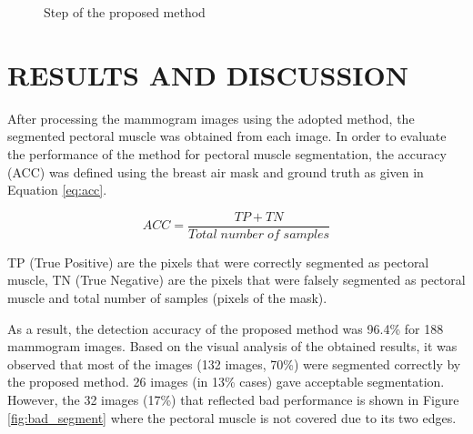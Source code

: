 \documentclass{article}
\begin{document}
\begin{figure}
\caption{Step of the proposed method}
\end{figure}


\section{RESULTS AND DISCUSSION}
\label{sec:res_discuss}

After processing the mammogram images using the adopted method, the segmented pectoral muscle was obtained from each image. In order to evaluate the performance of the method for pectoral muscle segmentation, the accuracy (ACC) was defined using the breast air mask and ground truth as given in Equation \ref{eq:acc}.

    \begin{equation}\label{eq:acc}
       ACC = \frac{TP + TN}{Total\; number\; of\; samples}
    \end{equation}

TP (True Positive) are the pixels that were correctly segmented as pectoral muscle, TN (True Negative) are the pixels that were falsely segmented as pectoral muscle and total number of samples (pixels of the mask).

As a result, the detection accuracy of the proposed method was 96.4\% for 188 mammogram images. Based on the visual analysis of the obtained results, it was observed that most of the images (132 images, 70\%) were segmented correctly by the proposed method. 26 images (in 13\% cases) gave acceptable segmentation. However, the 32 images (17\%) that reflected bad performance is shown in Figure \ref{fig:bad_segment} where the pectoral muscle is not covered due to its two edges.
\end{document}
